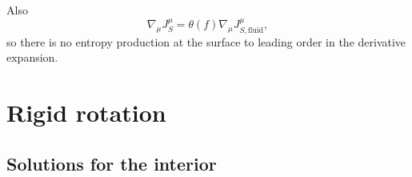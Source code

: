 \documentclass[12pt]{article}
\begin{document}
Also
%
\begin{equation*}
  \nabla_\mu J^\mu_S= \theta(f)\nabla_\mu J^\mu_{S,\text{fluid}},
\end{equation*}
%
so there is no entropy production at the surface to leading order in the derivative expansion.






\section{Rigid rotation}\label{sec:rigidrot}

\subsection{Solutions for the interior}\label{sec:rotint}
\end{document}
